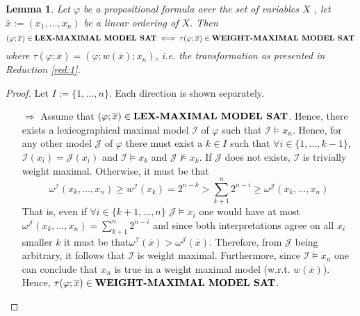 \documentclass [11pt]{article}
\newcommand{\MAXWEIGHTSAT}{\mbox{\bf WEIGHT-MAXIMAL MODEL SAT}}
\newcommand{\MAXLEXSAT}{\mbox{\bf LEX-MAXIMAL MODEL SAT}}
\newcommand{\nmodels}{\not\models}
\newtheorem{lemma}[theorem]{Lemma}
\begin{document}
\begin{lemma}
Let $\varphi$ be a propositional formula over the set of variables $X$ , let $\overline{x}:=(x_1,\dots,x_n)$ be a linear ordering of $X$. Then
\small
\begin{equation*}
(\varphi;\overline{x}) \in \MAXLEXSAT \iff \tau(\varphi;\overline{x}) \in \MAXWEIGHTSAT
\end{equation*}
where $\tau(\varphi;\overline{x})=(\varphi;w(\overline{x}); x_n)$, i.e. the transformation as presented in Reduction \ref{red:1}.
\end{lemma}
\begin{proof}
 Let $I:= \{1,\dots ,n\}$. Each direction is shown separately.
\begin{itemize}
\item[$\Rightarrow$] Assume that $(\varphi;\overline{x}) \in \MAXLEXSAT$. Hence, there exists a lexicographical maximal model $\mathcal{I}$ of $\varphi$ such that $\mathcal{I}\models x_n$. Hence, for any other model $\mathcal{J}$ of $\varphi$ there must exist a $k \in I$ such that  $\forall i  \in \{1,\dots , k-1\}$, $\mathcal{I}(x_i)=\mathcal{J}(x_i)$ and $\mathcal{I} \models x_k$ and $\mathcal{J} \nmodels x_k$. If $\mathcal{J}$ does not exists, $\mathcal{I}$ is trivially weight maximal. Otherwise, it must be that
\begin{equation*}
\omega^{\mathcal{I}}(x_{k}, \dots , x_n) \geq w^{\mathcal{I}}(x_k)=2^{n-k}> \sum_{k+1}^n 2^{n-i}\geq \omega^{\mathcal{J}}(x_{k}, \dots , x_n)
\end{equation*}
That is, even if $\forall i \in \{k+1, \dots, n\}$ $\mathcal{J} \models x_i $ one would have at most $\omega^{\mathcal{J}}(x_{k}, \dots , x_n)= \sum_{k+1}^n 2^{n-i}$ and since both interpretations agree on all $x_i$ smaller $k$ it must be that$\omega^{\mathcal{I}}(\overline{x})> \omega^{\mathcal{J}}(\overline{x})$. Therefore, from $\mathcal{J}$ being arbitrary, it follows that $\mathcal{I}$ is weight maximal. Furthermore, since $\mathcal{I} \models x_n$ one can conclude that $x_n$ is true in a weight maximal model (w.r.t. $w(\overline{x})$). Hence, $\tau(\varphi;\overline{x})\in \MAXWEIGHTSAT$.


\end{itemize}
\end{proof}
\end{document}
